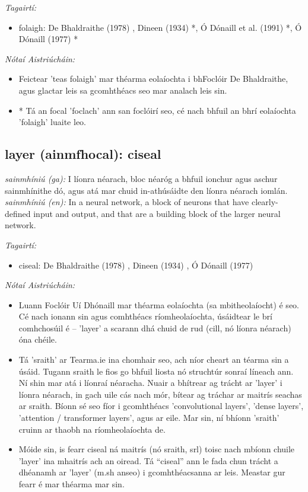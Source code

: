 \documentclass{article}
\begin{document}
 \noindent \textit{Tagairtí:}
\begin{itemize}
	\item folaigh: De Bhaldraithe (1978) \cite{de-bhaldraithe}, Dineen (1934) \cite{dineen}*, Ó Dónaill et al. (1991) \cite{focloir-beag}*, Ó Dónaill (1977) \cite{odonaill}*
\end{itemize}

 \noindent \textit{Nótaí Aistriúcháin:}
\begin{itemize}
	\item Feictear 'teas folaigh' mar théarma eolaíochta i bhFoclóir De Bhaldraithe, agus glactar leis sa gcomhthéacs seo mar analach leis sin.
	\item * Tá an focal 'foclach' ann san foclóirí seo, cé nach bhfuil an bhrí eolaíochta 'folaigh' luaite leo.
\end{itemize}


\subsection*{layer (ainmfhocal): ciseal} 
 \noindent \textit{sainmhíniú (ga):} I líonra néarach, bloc néaróg a bhfuil ionchur agus aschur sainmhínithe dó, agus atá mar chuid in-athúsáidte den líonra néarach iomlán.
\newline\newline
 \noindent \textit{sainmhíniú (en):} In a neural network, a block of neurons that have clearly-defined input and output, and that are a building block of the larger neural network.
\newline

 \noindent \textit{Tagairtí:}
\begin{itemize}
	\item ciseal: De Bhaldraithe (1978) \cite{de-bhaldraithe}, Dineen (1934) \cite{dineen}, Ó Dónaill (1977) \cite{odonaill}
\end{itemize}

 \noindent \textit{Nótaí Aistriúcháin:}
\begin{itemize}
	\item Luann Foclóir Uí Dhónaill mar théarma eolaíochta (sa mbitheolaíocht) é seo. Cé nach ionann sin agus comhthéacs ríomheolaíochta, úsáidtear le brí comhchosúil é -- 'layer' a scarann dhá chuid de rud (cill, nó líonra néarach) óna chéile.
	\item Tá 'sraith' ar Tearma.ie ina chomhair seo, ach níor cheart an téarma sin a úsáid. Tugann sraith le fios go bhfuil liosta nó struchtúr sonraí líneach ann. Ní shin mar atá i líonraí néaracha. Nuair a bhítrear ag trácht ar 'layer' i líonra néarach, in gach uile cás nach mór, bítear ag tráchar ar maitrís seachas ar sraith. Bíonn sé seo fíor i gcomhthéacs 'convolutional layers', 'dense layers', 'attention / transformer layers', agus ar eile. Mar sin, ní bhíonn 'sraith' cruinn ar thaobh na ríomheolaíochta de.
	\item Móide sin, is fearr ciseal ná maitrís (nó sraith, srl) toisc nach mbíonn chuile 'layer' ina mhaitrís ach an oiread. Tá “ciseal” ann le fada chun trácht a dhéanamh ar 'layer' (m.sh anseo) i gcomhthéacsanna ar leis. Meastar gur fearr é mar théarma mar sin.
\end{itemize}
\end{document}
